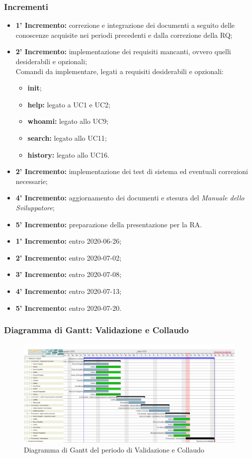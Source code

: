 	\subsubsection{Incrementi}
			\begin{itemize}
				\item \textbf{1' Incremento:} correzione e integrazione dei documenti a seguito delle conoscenze acquisite nei periodi precedenti e dalla correzione della RQ;
				\item \textbf{2' Incremento:} implementazione dei requisiti mancanti, ovvero quelli desiderabili e opzionali;\\
				Comandi da implementare, legati a requisiti desiderabili e opzionali:
					\begin{itemize}
						\item \textbf{init};
						\item \textbf{help:} legato a UC1 e UC2;
						\item \textbf{whoami:} legato allo UC9;
						\item \textbf{search:} legato allo UC11;
						\item \textbf{history:} legato allo UC16.
					\end{itemize}
				\item \textbf{2' Incremento:} implementazione dei test di sistema ed eventuali correzioni necessarie;
				\item \textbf{4' Incremento:} aggiornamento dei documenti e stesura del \textit{Manuale dello Sviluppatore};
				\item \textbf{5' Incremento:} preparazione della presentazione per la RA.
			\end{itemize}
			\begin{itemize}
				\item \textbf{1' Incremento:} entro 2020-06-26;
				\item \textbf{2' Incremento:} entro 2020-07-02;
				\item \textbf{3' Incremento:} entro 2020-07-08;
				\item \textbf{4' Incremento:} entro 2020-07-13;
				\item \textbf{5' Incremento:} entro 2020-07-20.
			\end{itemize}
	\subsubsection{Diagramma di Gantt: Validazione e Collaudo}
		\begin{figure}[h]
			\centering
			\includegraphics[width=1.1\textwidth]{./res/img/DiagrammiGantt/validaz_gantt.png}
			\caption{Diagramma di Gantt del periodo di Validazione e Collaudo}
		\end{figure}
